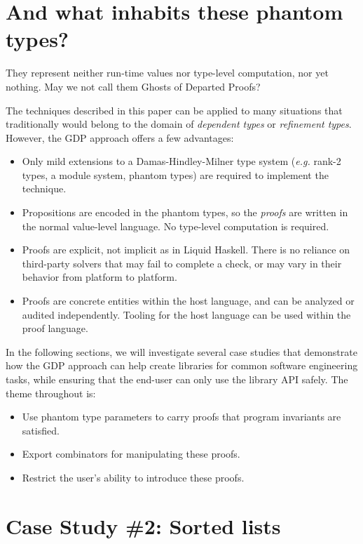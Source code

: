 \documentclass[format=sigplan, review=false, screen=true]{acmart}
\begin{document}
\section{And what inhabits these phantom types?}
They represent neither run-time values nor type-level computation, nor yet nothing.
May we not call them Ghosts of Departed Proofs?

The techniques described in this paper can be applied to many
situations that traditionally would belong to the domain of
\emph{dependent types} or \emph{refinement types}. However, the
GDP approach offers a few advantages:
\begin{itemize}
\item Only mild extensions to a Damas-Hindley-Milner type system
  ({\it e.g.} rank-2 types, a module system, phantom types) are required to
  implement the technique.
\item Propositions are encoded in the phantom types, so the
  \emph{proofs} are written in the normal value-level language.
  No type-level computation is required.
\item Proofs are explicit, not implicit as in Liquid Haskell. There is
  no reliance on third-party solvers that may fail to complete a check,
  or may vary in their behavior from platform to platform.
\item Proofs are concrete entities within the host language, and can
  be analyzed or audited independently. Tooling for the host language
  can be used within the proof language.
\end{itemize}

In the following sections, we will investigate several case studies that
demonstrate how the GDP approach can help create libraries for common
software engineering tasks, while ensuring that the end-user can only
use the library API safely. The theme throughout is:
\begin{itemize}
\item Use phantom type parameters to carry proofs that program invariants are satisfied.
\item Export combinators for manipulating these proofs.
\item Restrict the user's ability to introduce these proofs.
\end{itemize}

\section{Case Study \#2: Sorted lists}
\end{document}
